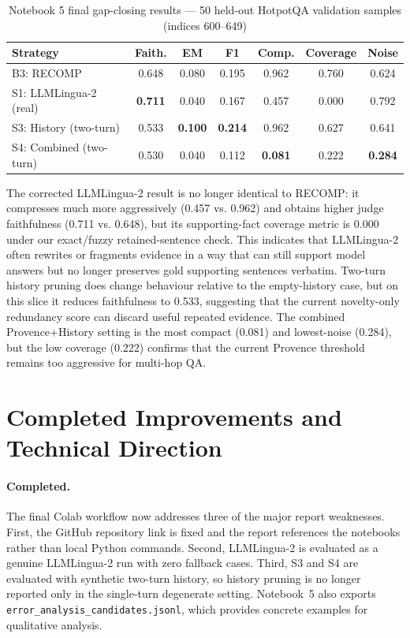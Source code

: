 \documentclass[11pt,a4paper]{article}
\begin{document}
\begin{table}[H]
\centering
\caption{Notebook 5 final gap-closing results --- 50 held-out HotpotQA validation samples (indices 600--649)}
\label{tab:gap-results}
\begin{tabular}{lcccccc}
\toprule
\textbf{Strategy} & \textbf{Faith.} & \textbf{EM} & \textbf{F1} & \textbf{Comp.} & \textbf{Coverage} & \textbf{Noise} \\
\midrule
B3: RECOMP & 0.648 & 0.080 & 0.195 & 0.962 & 0.760 & 0.624 \\
S1: LLMLingua-2 (real) & \textbf{0.711} & 0.040 & 0.167 & 0.457 & 0.000 & 0.792 \\
S3: History (two-turn) & 0.533 & \textbf{0.100} & \textbf{0.214} & 0.962 & 0.627 & 0.641 \\
S4: Combined (two-turn) & 0.530 & 0.040 & 0.112 & \textbf{0.081} & 0.222 & \textbf{0.284} \\
\bottomrule
\end{tabular}
\end{table}

The corrected LLMLingua-2 result is no longer identical to RECOMP: it compresses much more aggressively (0.457 vs. 0.962) and obtains higher judge faithfulness (0.711 vs. 0.648), but its supporting-fact coverage metric is 0.000 under our exact/fuzzy retained-sentence check. This indicates that LLMLingua-2 often rewrites or fragments evidence in a way that can still support model answers but no longer preserves gold supporting sentences verbatim. Two-turn history pruning does change behaviour relative to the empty-history case, but on this slice it reduces faithfulness to 0.533, suggesting that the current novelty-only redundancy score can discard useful repeated evidence. The combined Provence+History setting is the most compact (0.081) and lowest-noise (0.284), but the low coverage (0.222) confirms that the current Provence threshold remains too aggressive for multi-hop QA.

\section{Completed Improvements and Technical Direction}

\paragraph{Completed.}
The final Colab workflow now addresses three of the major report weaknesses. First, the GitHub repository link is fixed and the report references the notebooks rather than local Python commands. Second, LLMLingua-2 is evaluated as a genuine LLMLingua-2 run with zero fallback cases. Third, S3 and S4 are evaluated with synthetic two-turn history, so history pruning is no longer reported only in the single-turn degenerate setting. Notebook~5 also exports \texttt{error\_analysis\_candidates.jsonl}, which provides concrete examples for qualitative analysis.
\end{document}
